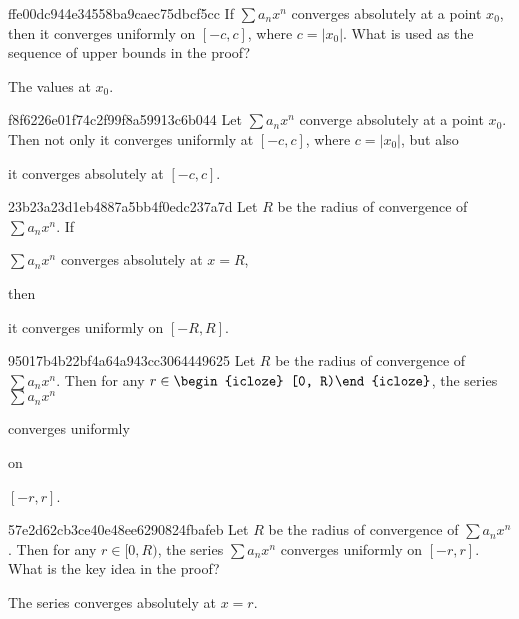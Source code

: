 \begin{note}{ffe00dc944e34558ba9caec75dbcf5cc}
    If \({ \sum a_n x^{n} }\) converges absolutely at a point \({ x_0 }\), then it converges uniformly on \({ [-c, c] }\), where \({ c = \left\lvert x_0 \right\rvert }\).
    What is used as the sequence of upper bounds in the proof?

    \begin{cloze}{1}
        The values at \({ x_0 }\).
    \end{cloze}
\end{note}

\begin{note}{f8f6226e01f74c2f99f8a59913c6b044}
    Let \({ \sum a_n x^{n} }\) converge absolutely at a point \({ x_0 }\).
    Then not only it converges uniformly at \({ [-c, c] }\), where \({ c = \left\lvert x_0 \right\rvert }\), but also \begin{icloze}{1}it converges absolutely at \({ [-c, c] }\).\end{icloze}
\end{note}

\begin{note}{23b23a23d1eb4887a5bb4f0edc237a7d}
    Let \({ R }\) be the radius of convergence of \({ \sum a_n x^{n} }\).
    If \begin{icloze}{2}\({ \sum a_n x^{n} }\) converges absolutely at \({ x = R }\),\end{icloze} then \begin{icloze}{1}it converges uniformly on \({ [-R, R] }\).\end{icloze}
\end{note}

\begin{note}{95017b4b22bf4a64a943cc3064449625}
    Let \({ R }\) be the radius of convergence of \({ \sum a_n x^{n} }\).
    Then for any \({ r \in \begin{icloze}{3}[0, R)\end{icloze} }\), the series \({ \sum a_n x^{n} }\) \begin{icloze}{2}converges uniformly\end{icloze} on \begin{icloze}{1}\({ [-r, r] }\).\end{icloze}
\end{note}

\begin{note}{57e2d62cb3ce40e48ee6290824fbafeb}
    Let \({ R }\) be the radius of convergence of \({ \sum a_n x^{n} }\).
    Then for any \({ r \in [0, R) }\), the series \({ \sum a_n x^{n} }\) converges uniformly on \({ [-r, r] }\).
    What is the key idea in the proof?

    \begin{cloze}{1}
        The series converges absolutely at \({ x = r }\).
    \end{cloze}
\end{note}

